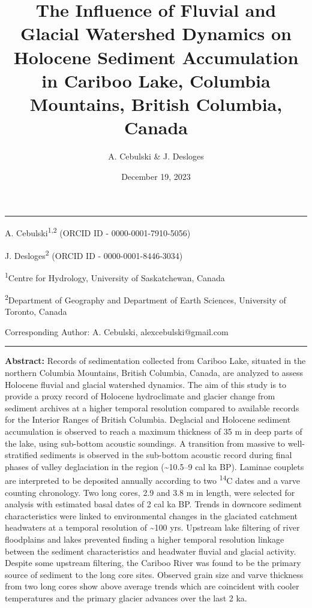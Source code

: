\documentclass[
  letterpaper,
  DIV=11,
  numbers=noendperiod]{scrartcl}
\title{The Influence of Fluvial and Glacial Watershed Dynamics on
Holocene Sediment Accumulation in Cariboo Lake, Columbia Mountains,
British Columbia, Canada}
\author{A. Cebulski \& J. Desloges}
\date{December 19, 2023}
\begin{document}
\maketitle
\ifdefined\Shaded\renewenvironment{Shaded}{\begin{tcolorbox}[interior hidden, enhanced, boxrule=0pt, sharp corners, frame hidden, breakable, borderline west={3pt}{0pt}{shadecolor}]}{\end{tcolorbox}}\fi

\begin{center}\rule{0.5\linewidth}{0.5pt}\end{center}

A. Cebulski\textsuperscript{1,2} (ORCID ID - 0000-0001-7910-5056)

J. Desloges\textsuperscript{2} (ORCID ID - 0000-0001-8446-3034)

\textsuperscript{1}Centre for Hydrology, University of Saskatchewan,
Canada

\textsuperscript{2}Department of Geography and Department of Earth
Sciences, University of Toronto, Canada

Corresponding Author: A. Cebulski, alexcebulski@gmail.com

\begin{center}\rule{0.5\linewidth}{0.5pt}\end{center}

\pagebreak

\textbf{Abstract:} Records of sedimentation collected from Cariboo Lake,
situated in the northern Columbia Mountains, British Columbia, Canada,
are analyzed to assess Holocene fluvial and glacial watershed dynamics.
The aim of this study is to provide a proxy record of Holocene
hydroclimate and glacier change from sediment archives at a higher
temporal resolution compared to available records for the Interior
Ranges of British Columbia. Deglacial and Holocene sediment accumulation
is observed to reach a maximum thickness of 35 m in deep parts of the
lake, using sub-bottom acoustic soundings. A transition from massive to
well-stratified sediments is observed in the sub-bottom acoustic record
during final phases of valley deglaciation in the region
(\textasciitilde10.5--9 cal ka BP). Laminae couplets are interpreted to
be deposited annually according to two \textsuperscript{14}C dates and a
varve counting chronology. Two long cores, 2.9 and 3.8 m in length, were
selected for analysis with estimated basal dates of 2 cal ka BP. Trends
in downcore sediment characteristics were linked to environmental
changes in the glaciated catchment headwaters at a temporal resolution
of \textasciitilde100 yrs. Upstream lake filtering of river floodplains
and lakes prevented finding a higher temporal resolution linkage between
the sediment characteristics and headwater fluvial and glacial activity.
Despite some upstream filtering, the Cariboo River was found to be the
primary source of sediment to the long core sites. Observed grain size
and varve thickness from two long cores show above average trends which
are coincident with cooler temperatures and the primary glacier advances
over the last 2 ka.
\end{document}
